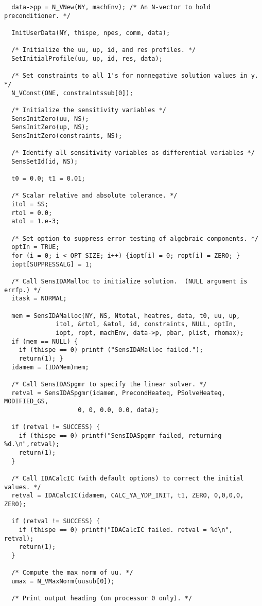 \begin{verbatim}
  data->pp = N_VNew(NY, machEnv); /* An N-vector to hold preconditioner. */

  InitUserData(NY, thispe, npes, comm, data);

  /* Initialize the uu, up, id, and res profiles. */
  SetInitialProfile(uu, up, id, res, data);

  /* Set constraints to all 1's for nonnegative solution values in y. */
  N_VConst(ONE, constraintssub[0]);

  /* Initialize the sensitivity variables */
  SensInitZero(uu, NS);
  SensInitZero(up, NS);
  SensInitZero(constraints, NS);

  /* Identify all sensitivity variables as differential variables */
  SensSetId(id, NS);

  t0 = 0.0; t1 = 0.01;

  /* Scalar relative and absolute tolerance. */
  itol = SS;
  rtol = 0.0;
  atol = 1.e-3;

  /* Set option to suppress error testing of algebraic components. */
  optIn = TRUE;
  for (i = 0; i < OPT_SIZE; i++) {iopt[i] = 0; ropt[i] = ZERO; }
  iopt[SUPPRESSALG] = 1;

  /* Call SensIDAMalloc to initialize solution.  (NULL argument is errfp.) */
  itask = NORMAL;

  mem = SensIDAMalloc(NY, NS, Ntotal, heatres, data, t0, uu, up, 
		      itol, &rtol, &atol, id, constraints, NULL, optIn, 
		      iopt, ropt, machEnv, data->p, pbar, plist, rhomax);
  if (mem == NULL) {
    if (thispe == 0) printf ("SensIDAMalloc failed.");
    return(1); }
  idamem = (IDAMem)mem;

  /* Call SensIDASpgmr to specify the linear solver. */
  retval = SensIDASpgmr(idamem, PrecondHeateq, PSolveHeateq,  MODIFIED_GS, 
                    0, 0, 0.0, 0.0, data);

  if (retval != SUCCESS) {
    if (thispe == 0) printf("SensIDASpgmr failed, returning %d.\n",retval);
    return(1);
  }

  /* Call IDACalcIC (with default options) to correct the initial values. */
  retval = IDACalcIC(idamem, CALC_YA_YDP_INIT, t1, ZERO, 0,0,0,0, ZERO);

  if (retval != SUCCESS) {
    if (thispe == 0) printf("IDACalcIC failed. retval = %d\n", retval);
    return(1);
  }

  /* Compute the max norm of uu. */
  umax = N_VMaxNorm(uusub[0]);

  /* Print output heading (on processor 0 only). */


\end{verbatim}
